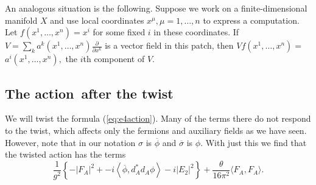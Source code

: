 \documentclass[twoside]{amsart}
\renewcommand{\eqref}[1]{(\ref{eq:#1})}
\newcommand{\action}{{action}{}}
\newcommand{\enm}[1]{\ensuremath{#1}}
\newcommand{\ip}[2]{\enm{\left<#1,#2\right>}}
\renewcommand{\bar}[1]{\overline{#1}}
\begin{document}
An analogous situation
is the following.  Suppose we work on a finite-dimensional manifold \(
X \) and use local coordinates \( x^{\mu}, \mu=1, \ldots, n \) to
express a computation.  Let \( f(x^{1}, \ldots, x^{n}) = x^{i} \) for
some fixed \( i \) in these coordinates.  If \( V =
\sum_{k}a^{k}(x^{1},\ldots,x^{n})\frac{\partial}{\partial x^{k}} \) is
a vector field in this patch, then \( Vf(x^{1}, \ldots, x^{n})   =
\) \(
a^{i}(x^{1}, \ldots, x^{n}),\)  the \( i \)th component of \( V \).

\subsection{The \action\ after the twist}
\label{sec:twistedaction}
We will twist the formula \eqref{e4action}.  Many of the terms
there do not respond to the twist, which affects only the fermions
and auxiliary fields as we have seen.  However, note that in our
notation \( \sigma \) is \( \bar{\phi} \) and \( \bar{\sigma} \) is \(
\phi \).  With just this we find that the twisted action has the terms
\[ \frac{1}{g^{2}}\left\{-|F_{A}|^{2} +
-i\ip{\bar{\phi}}{d_{A}^{*}d_{A}\phi} -i
|E_{2}|^{2}\right\} + \frac{\theta}{16\pi^{2}}\langle F_{A},F_{A}\rangle . \]
\end{document}
